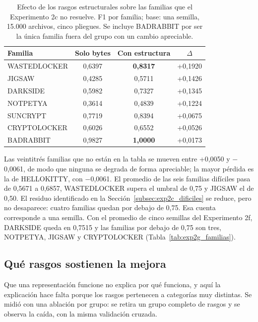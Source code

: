 \begin{table}[ht]
\centering
\caption{Efecto de los rasgos estructurales sobre las familias que el Experimento 2c no resuelve. F1 por familia; base: una semilla, 15.000 archivos, cinco pliegues. Se incluye BADRABBIT por ser la única familia fuera del grupo con un cambio apreciable.}
\label{tab:exp2e_dificiles}
\begin{tabular}{|l|c|c|c|}
\hline
\textbf{Familia} & \textbf{Solo bytes} & \textbf{Con estructura} & \textbf{$\Delta$} \\
\hline
WASTEDLOCKER & 0,6397 & \textbf{0,8317} & +0,1920 \\
JIGSAW & 0,4285 & 0,5711 & +0,1426 \\
DARKSIDE & 0,5982 & 0,7327 & +0,1345 \\
NOTPETYA & 0,3614 & 0,4839 & +0,1224 \\
SUNCRYPT & 0,7719 & 0,8394 & +0,0675 \\
CRYPTOLOCKER & 0,6026 & 0,6552 & +0,0526 \\
\hline
BADRABBIT & 0,9827 & \textbf{1,0000} & +0,0173 \\
\hline
\end{tabular}
\end{table}

Las veintitrés familias que no están en la tabla se mueven entre +0,0050 y $-$0,0061, de modo que ninguna se degrada de forma apreciable; la mayor pérdida es la de HELLOKITTY, con $-$0,0061. El promedio de las seis familias difíciles pasa de 0,5671 a 0,6857, WASTEDLOCKER supera el umbral de 0,75 y JIGSAW el de 0,50. El residuo identificado en la Sección~\ref{subsec:exp2c_dificiles} se reduce, pero no desaparece: cuatro familias quedan por debajo de 0,75. Esa cuenta corresponde a una semilla. Con el promedio de cinco semillas del Experimento 2f, DARKSIDE queda en 0,7515 y las familias por debajo de 0,75 son tres, NOTPETYA, JIGSAW y CRYPTOLOCKER (Tabla~\ref{tab:exp2g_familias}).

\subsection{Qué rasgos sostienen la mejora}

Que una representación funcione no explica por qué funciona, y aquí la explicación hace falta porque los rasgos pertenecen a categorías muy distintas. Se midió con una ablación por grupo: se retira un grupo completo de rasgos y se observa la caída, con la misma validación cruzada.


